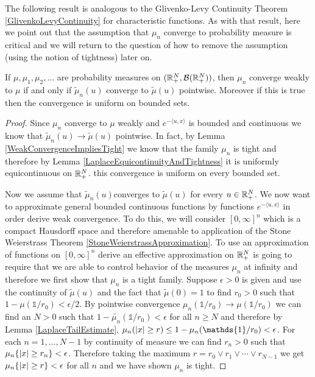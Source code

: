 The following result is analogous to the Glivenko-Levy Continuity
Theorem \ref{GlivenkoLevyContinuity} for characteristic functions.  As
with that result, here we point out that the assumption that $\mu_n$
converge to probability measure is critical and we will return to the
question of how to remove the assumption (using the notion of tightness) later on.
\begin{thm}\label{GlivenkoLevyContinuityLaplace}If $\mu, \mu_1, \mu_2, \dots$
  are probability measures on $(\mathbb{R}^N_+, \mathcal{B}(\mathbb{R}^N_+))$,
  then $\mu_n$ converge weakly to $\mu$ if and only if $\tilde{\mu}_n(u)$
  converge to $\tilde{\mu}(u)$ pointwise.  Moreover if this is true
  then the convergence is uniform on bounded sets.
\end{thm}
\begin{proof}
Since $\mu_n$ converge to $\mu$ weakly and $e^{-\langle u,x \rangle}$
is bounded and continuous we know that $\tilde{\mu}_n(u) \to
\tilde{\mu}(u)$ pointwise.  In fact, by Lemma
\ref{WeakConvergenceImpliesTight} we know that the family $\mu_n$
is tight and therefore by Lemma
\ref{LaplaceEquicontinuityAndTightness} it is uniformly equicontinuous
on $\mathbb{R}^N_+$.  this convergence is uniform on
every bounded set.

Now we assume that $\tilde{\mu}_n(u)$converges to $\tilde{\mu}(u)$ for
every $u \in \mathbb{R}^N_+$.  We now want to approximate general bounded
continuous functions by functions $e^{-\langle u,x \rangle}$ in order
derive weak convergence.  To do this, we will consider $[0,\infty]^n$
which is a compact Hausdorff space and therefore amenable to
application of the Stone Weierstrass Theorem
\ref{StoneWeierstrassApproximation}.  To use an approximation of
functions on $[0,\infty]^n$ derive an effective approximation on
$\mathbb{R}^N_+$ is going to require that we are able to control behavior
of the measures $\mu_n$ at infinity and therefore we first show that
$\mu_n$ is a tight family.  Suppose $\epsilon > 0$ is given and use
the continuity of $\tilde{\mu}(u)$ and the fact that
$\tilde{\mu}(0)=1$ to find $r_0 > 0$ such that $1 - \mu(\mathds{1}/r_0) <
\epsilon/2$.  By pointwise convergence $\mu_n(\mathds{1}/r_0) \to \mu(\mathds{1}/r_0)$ we
can find an $N > 0$ such that $1 - \tilde{\mu_n}(\mathds{1}/r_0) < \epsilon$ for all $n
\geq N$ and therefore by Lemma \ref{LaplaceTailEstimate}, $\mu_n(\abs{x} \geq r)  \leq 1 - \mu_n(\mathds{1}/r_0) <
\epsilon$.  For each $n = 1, \dotsc, N-1$ by continuity of measure  we
can find $r_n > 0$ such that $\mu_n\lbrace \left \vert x \right \vert \geq r_n \rbrace <
\epsilon$.  Therefore taking the maximum $r = r_0 \vee r_1 \vee \dotsb \vee
r_{N-1}$ we get $\mu_n\lbrace \left \vert x \right \vert \geq r \rbrace <
\epsilon$ for all $n$ and we have shown $\mu_n$ is tight.


\end{proof}
